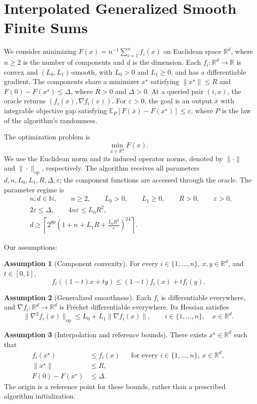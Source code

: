 \documentclass[10pt]{article}
\theoremstyle{definition}
\newtheorem{assumption}{Assumption}
\begin{document}
\section*{Interpolated Generalized Smooth Finite Sums}
We consider minimizing $F(x)=n^{-1}\sum_{i=1}^n f_i(x)$ on Euclidean space $\mathbb{R}^d$, where $n\geq2$ is the number of components and $d$ is the dimension. Each $f_i:\mathbb{R}^d\to\mathbb{R}$ is convex and $(L_0,L_1)$-smooth, with $L_0>0$ and $L_1\geq0$, and has a differentiable gradient. The components share a minimizer $x^\star$ satisfying $\|x^\star\|\leq R$ and $F(0)-F(x^\star)\leq\Delta$, where $R>0$ and $\Delta>0$. At a queried pair $(i,x)$, the oracle returns $(f_i(x),\nabla f_i(x))$. For $\varepsilon>0$, the goal is an output $\bar{x}$ with integrable objective gap satisfying $\mathbb{E}_P[F(\bar{x})-F(x^\star)]\leq\varepsilon$, where $P$ is the law of the algorithm's randomness.

The optimization problem is
\[
\min_{x\in\mathbb{R}^d} F(x).
\]
We use the Euclidean norm and its induced operator norms, denoted by $\|\cdot\|$ and $\|\cdot\|_{\mathrm{op}}$, respectively. The algorithm receives all parameters $d,n,L_0,L_1,R,\Delta,\varepsilon$; the component functions are accessed through the oracle. The parameter regime is
\[
\begin{aligned}
&n,d\in\mathbb{N},\qquad n\geq2,\qquad L_0>0,\qquad L_1\geq0,\qquad R>0,\qquad \varepsilon>0,\\
&2\varepsilon\leq\Delta,\qquad 4n\varepsilon\leq L_0R^2,\\
&d\geq\left\lceil 2^{80}\left(1+n+L_1R+\frac{L_0R^2}{\varepsilon}\right)^{24}\right\rceil.
\end{aligned}
\]

Our assumptions:
\begin{assumption}[Component convexity]
For every $i\in\{1,\ldots,n\}$, $x,y\in\mathbb{R}^d$, and $t\in[0,1]$,
\[
f_i((1-t)x+ty)\leq(1-t)f_i(x)+tf_i(y).
\]
\end{assumption}

\begin{assumption}[Generalized smoothness]
Each $f_i$ is differentiable everywhere, and $\nabla f_i:\mathbb{R}^d\to\mathbb{R}^d$ is Fr\'echet differentiable everywhere. Its Hessian satisfies
\[
\|\nabla^2 f_i(x)\|_{\mathrm{op}}
\leq L_0+L_1\|\nabla f_i(x)\|,
\qquad i\in\{1,\ldots,n\},\quad x\in\mathbb{R}^d.
\]
\end{assumption}

\begin{assumption}[Interpolation and reference bounds]
There exists $x^\star\in\mathbb{R}^d$ such that
\[
\begin{aligned}
f_i(x^\star)&\leq f_i(x)
&&\text{for every }i\in\{1,\ldots,n\},\ x\in\mathbb{R}^d,\\
\|x^\star\|&\leq R,\\
F(0)-F(x^\star)&\leq\Delta.
\end{aligned}
\]
The origin is a reference point for these bounds, rather than a prescribed algorithm initialization.
\end{assumption}
\end{document}
